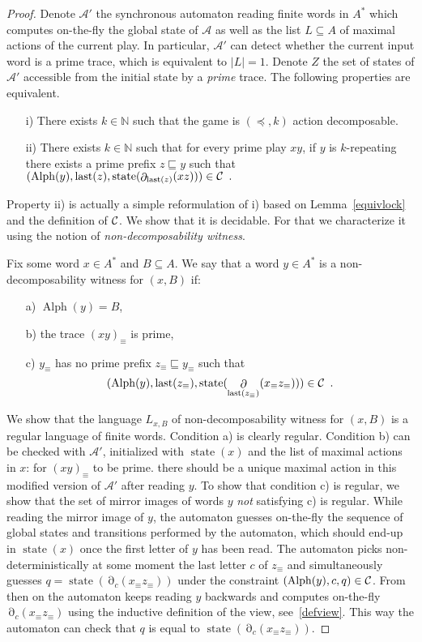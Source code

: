 \documentclass[a4paper,UKenglish]{lipics-v2016}
\newcommand{\NN}{\mathbb{N}}
\renewcommand{\AA}{\mathcal{A}}
\newcommand{\pref}{\sqsubseteq}
\DeclareMathOperator{\view}{\partial}
\DeclareMathOperator{\last}{last}
\DeclareMathOperator{\alphabet}{Alph}
\DeclareMathOperator{\state}{state}
\begin{document}
\begin{proof}
Denote $\AA'$ the 
synchronous automaton reading finite words in
$A^*$ 
which computes on-the-fly the  global state of $\AA$
as well as the list $L\subseteq A$ of maximal actions of the current play.
In particular, $\AA'$ can detect whether the current input word is a prime trace, which is equivalent to $|L|=1$.
Denote $Z$ the set of states of $\AA'$
accessible from the initial state by a \emph{prime} trace.
The following properties are equivalent.

 \begin{itemize}
 \item[i)]
 There exists $k\in\NN$ such that
 the game is $(\preceq,k)$ action decomposable.
 \item[ii)]
 There exists $k\in\NN$
 such that for every prime play $xy$,
if $y$ is $k$-repeating
there exists a prime prefix $z\pref y$
such that
$
(\alphabet(y), \last(z), \state(\view_{\last(z)}(xz)))\in \CC\enspace.$
\end{itemize}

Property ii) is actually a simple reformulation of i)
 based on Lemma~\ref{equivlock} and the definition of $\mathcal{C}$.
 We show that it is decidable. For that we characterize it using the notion of \emph{non-decomposability witness}.

Fix some word $x\in A^*$ and $B\subseteq A$. We say that a word $y\in A^*$ is a non-decomposability witness for $(x,B)$
if:
\begin{itemize}
\item[a)]
$\alphabet(y)=B$,
\item[b)]
the trace $(xy)_\equiv$ is prime,
\item[c)]
$y_\equiv$ has no prime prefix $z_\equiv\pref y_\equiv$ such that
\begin{equation}\label{crit}
(\alphabet(y), \last(z_\equiv), \state(\view_{\last(z_\equiv)}(x_\equiv z_\equiv)))\in \CC\enspace.
\end{equation}
\end{itemize}

We show that the language $L_{x,B}$ of non-decomposability witness for $(x,B)$ is a regular language of finite words.
Condition a) is clearly regular.
Condition b) can be checked with $\AA'$,
initialized with $\state(x)$ and the list of maximal actions in $x$:
for $(xy)_\equiv$ to be prime.
there should be a unique maximal action in this modified version of $\AA'$
after reading $y$.
To show that condition c) is regular,
we show that the set of mirror images of words $y$ \emph{not} satisfying c) is regular.
While reading the mirror image of $y$,
the automaton guesses on-the-fly
the sequence of global states and transitions performed by the automaton,
which should end-up in $\state(x)$ once the first letter of $y$ has been read.
The automaton picks non-deterministically at some moment the last letter $c$ of $z_\equiv$ and
simultaneously guesses $q=\state(\view_{c}(x_\equiv z_\equiv))$
under the constraint 
$(\alphabet(y), c, q)\in \CC$.
From then on the automaton keeps reading $y$ backwards
and computes on-the-fly $\view_{c}(x_\equiv z_\equiv)$ 
using the inductive definition of the view, see~\eqref{defview}.
This way the automaton can check that $q$ is equal to
$\state(\view_{c}(x_\equiv z_\equiv))$.



\end{proof}
\end{document}
